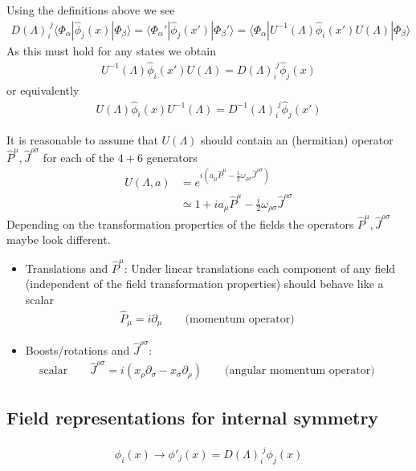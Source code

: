 \documentclass[10pt,a4paper]{report}
\theoremstyle{definition}
\begin{document}
Using the definitions above we see
\begin{align}
D(\Lambda)^{\;j}_i\langle\Phi_\alpha|\hat{\phi}_j(x)|\Phi_\beta\rangle
=\langle\Phi_\alpha'|\hat{\phi}_j(x')|\Phi_\beta'\rangle
=\langle\Phi_\alpha|U^{-1}(\Lambda)\hat{\phi}_i(x')U(\Lambda)|\Phi_\beta\rangle
\end{align}
As this must hold for any states we obtain
\begin{align}
U^{-1}(\Lambda)\hat{\phi}_i(x')U(\Lambda)=D(\Lambda)^{\;j}_i\hat{\phi}_j(x)
\end{align}
or equivalently
\begin{align}
U(\Lambda)\hat{\phi}_i(x)U^{-1}(\Lambda)=D^{-1}(\Lambda)^{\;j}_i\hat{\phi}_j(x')
\end{align}

It is reasonable to assume that $U(\Lambda)$ should contain an (hermitian) operator $\hat{P}^\mu, \hat{J}^{\rho\sigma}$ for each of the $4+6$ generators
\begin{align}
U(\Lambda,a)
&=e^{i(a_\mu \hat{P}^\mu-\frac{1}{2}\omega_{\rho\sigma}\hat{J}^{\rho\sigma})}\\
&\simeq 1+ia_\mu \hat{P}^\mu-\frac{i}{2}\omega_{\rho\sigma}\hat{J}^{\rho\sigma}
\end{align}
Depending on the transformation properties of the fields the operators $\hat{P}^\mu, \hat{J}^{\rho\sigma}$ maybe look different.

\begin{itemize}
\item Translations and $\hat{P}^\mu$: Under linear translations each component of any field (independent of the field transformation properties) should behave like a scalar
\begin{align}
\hat{P}_\mu=i\partial_\mu\qquad\text{(momentum operator)}\qquad
\end{align}

\item Boosts/rotations and $\hat{J}^{\rho\sigma}$:
\begin{align}
\text{scalar}\qquad \hat{J}^{\rho\sigma}=i(x_\rho\partial_\sigma-x_\sigma\partial_\rho)\qquad\text{(angular momentum operator)}\qquad
\end{align}

\end{itemize}


\subsection{Field representations for internal symmetry}
\begin{align}
\phi_i(x)\rightarrow \phi'_j(x)=D(\Lambda)^{\;j}_i\phi_j(x)
\end{align}
\end{document}
